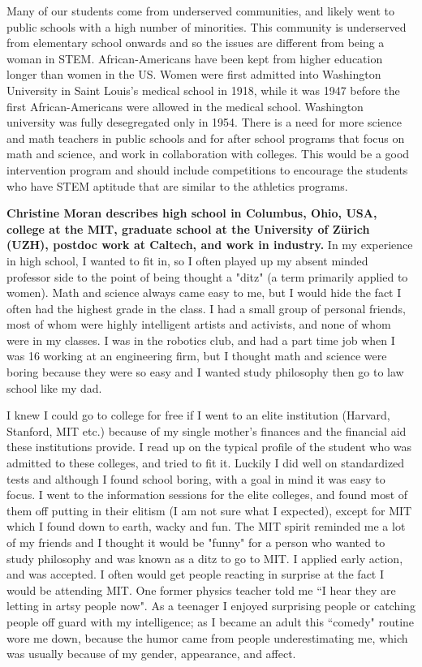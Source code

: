 \documentclass[utf8]{frontiersSCNS} %
\begin{document}
Many of our students come from underserved communities, and likely went to public schools with a high number of minorities. This community is underserved from elementary school onwards and so the issues are different from being a woman in STEM.  African-Americans have been kept from higher education longer than women in the US. Women were first admitted into Washington University in Saint Louis's medical school in 1918, while it was 1947 before the first African-Americans were allowed in the medical school. Washington university was fully desegregated only in 1954. There is a need for more science and math teachers in public schools and for after school programs that focus on math and science, and work in collaboration with colleges. This would be a good intervention program and should include competitions to encourage the students who have STEM aptitude that are similar to the athletics programs.


{\bf Christine Moran describes high school in Columbus, Ohio, USA, college at the MIT, graduate school at the University of Z\"{u}rich (UZH), postdoc work at Caltech, and work in industry.}
In my experience in high school, I wanted to fit in, so I often played up my absent minded professor side to the point of being thought a "ditz" (a term primarily applied to women). Math and science always came easy to me, but I would hide the fact I often had the highest grade in the class. I had a small group of personal friends, most of whom were highly intelligent artists and activists, and none of whom were in my classes. I was in the robotics club, and had a part time job when I was 16 working at an engineering firm, but I thought math and science were boring because they were so easy and I wanted study philosophy then go to law school like my dad. 

I knew I could go to college for free if I went to an elite institution (Harvard, Stanford, MIT etc.) because of my single mother's finances and the financial aid these institutions provide. I read up on the typical profile of the student who was admitted to these colleges, and tried to fit it. Luckily I did well on standardized tests and although I found school boring, with a goal in mind it was easy to focus. I went to the information sessions for the elite colleges, and found most of them off putting in their elitism (I am not sure what I expected), except for MIT which I found down to earth, wacky and fun. The MIT spirit reminded me a lot of my friends and I thought it would be "funny" for a person who wanted to study philosophy and was known as a ditz to go to MIT. I applied early action, and was accepted. I often would get people reacting in surprise at the fact I would be attending MIT. One former physics teacher told me ``I hear they are letting in artsy people now". As a teenager I enjoyed surprising people or catching people off guard with my intelligence; as I became an adult this ``comedy" routine wore me down, because the humor came from people underestimating me, which was usually because of my gender, appearance, and affect. 
\end{document}
